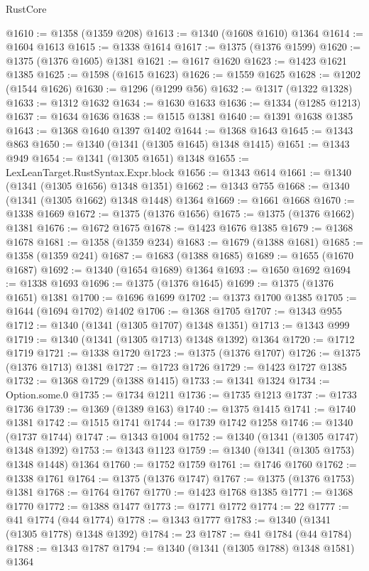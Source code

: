 \begin{lexlean}{RustCore}
\begin{coremodule}
@1610 := @1358 (@1359 @208)
@1613 := @1340 (@1608 @1610) @1364
@1614 := @1604 @1613
@1615 := @1338 @1614
@1617 := @1375 (@1376 @1599)
@1620 := @1375 (@1376 @1605) @1381
@1621 := @1617 @1620
@1623 := @1423 @1621 @1385
@1625 := @1598 (@1615 @1623)
@1626 := @1559 @1625
@1628 := @1202 (@1544 @1626)
@1630 := @1296 (@1299 @56)
@1632 := @1317 (@1322 @1328)
@1633 := @1312 @1632
@1634 := @1630 @1633
@1636 := @1334 (@1285 @1213)
@1637 := @1634 @1636
@1638 := @1515 @1381
@1640 := @1391 @1638 @1385
@1643 := @1368 @1640 @1397 @1402
@1644 := @1368 @1643
@1645 := @1343 @863
@1650 := @1340 (@1341 (@1305 @1645) @1348 @1415)
@1651 := @1343 @949
@1654 := @1341 (@1305 @1651) @1348
@1655 := LexLeanTarget.RustSyntax.Expr.block
@1656 := @1343 @614
@1661 := @1340 (@1341 (@1305 @1656) @1348 @1351)
@1662 := @1343 @755
@1668 := @1340 (@1341 (@1305 @1662) @1348 @1448) @1364
@1669 := @1661 @1668
@1670 := @1338 @1669
@1672 := @1375 (@1376 @1656)
@1675 := @1375 (@1376 @1662) @1381
@1676 := @1672 @1675
@1678 := @1423 @1676 @1385
@1679 := @1368 @1678
@1681 := @1358 (@1359 @234)
@1683 := @1679 (@1388 @1681)
@1685 := @1358 (@1359 @241)
@1687 := @1683 (@1388 @1685)
@1689 := @1655 (@1670 @1687)
@1692 := @1340 (@1654 @1689) @1364
@1693 := @1650 @1692
@1694 := @1338 @1693
@1696 := @1375 (@1376 @1645)
@1699 := @1375 (@1376 @1651) @1381
@1700 := @1696 @1699
@1702 := @1373 @1700 @1385
@1705 := @1644 (@1694 @1702) @1402
@1706 := @1368 @1705
@1707 := @1343 @955
@1712 := @1340 (@1341 (@1305 @1707) @1348 @1351)
@1713 := @1343 @999
@1719 := @1340 (@1341 (@1305 @1713) @1348 @1392) @1364
@1720 := @1712 @1719
@1721 := @1338 @1720
@1723 := @1375 (@1376 @1707)
@1726 := @1375 (@1376 @1713) @1381
@1727 := @1723 @1726
@1729 := @1423 @1727 @1385
@1732 := @1368 @1729 (@1388 @1415)
@1733 := @1341 @1324
@1734 := Option.some.{0}
@1735 := @1734 @1211
@1736 := @1735 @1213
@1737 := @1733 @1736
@1739 := @1369 (@1389 @163)
@1740 := @1375 @1415
@1741 := @1740 @1381
@1742 := @1515 @1741
@1744 := @1739 @1742 @1258
@1746 := @1340 (@1737 @1744)
@1747 := @1343 @1004
@1752 := @1340 (@1341 (@1305 @1747) @1348 @1392)
@1753 := @1343 @1123
@1759 := @1340 (@1341 (@1305 @1753) @1348 @1448) @1364
@1760 := @1752 @1759
@1761 := @1746 @1760
@1762 := @1338 @1761
@1764 := @1375 (@1376 @1747)
@1767 := @1375 (@1376 @1753) @1381
@1768 := @1764 @1767
@1770 := @1423 @1768 @1385
@1771 := @1368 @1770
@1772 := @1388 @1477
@1773 := @1771 @1772
@1774 := 22
@1777 := @41 @1774 (@44 @1774)
@1778 := @1343 @1777
@1783 := @1340 (@1341 (@1305 @1778) @1348 @1392)
@1784 := 23
@1787 := @41 @1784 (@44 @1784)
@1788 := @1343 @1787
@1794 := @1340 (@1341 (@1305 @1788) @1348 @1581) @1364

\end{coremodule}
\end{lexlean}
